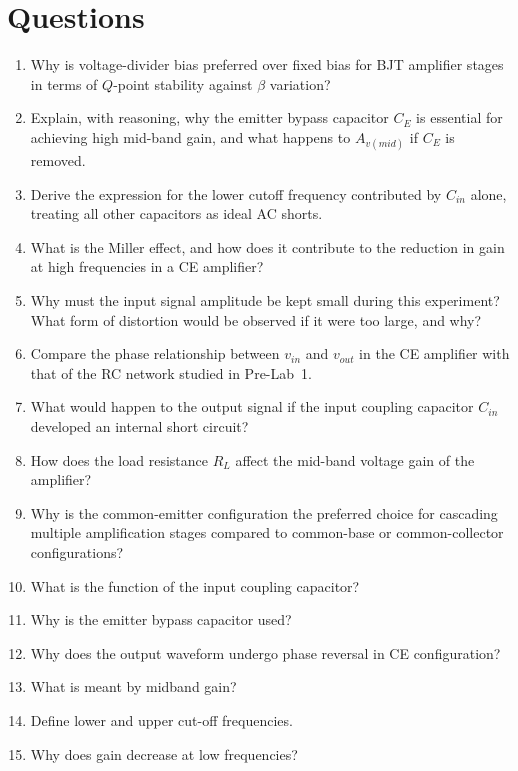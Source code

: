 \section{Questions}
\begin{enumerate}[label=Q\arabic*.]
	\item Why is voltage-divider bias preferred over fixed bias for BJT amplifier stages in terms of $Q$-point stability against $\beta$ variation?
	\item Explain, with reasoning, why the emitter bypass capacitor $C_E$ is essential for achieving high mid-band gain, and what happens to $A_{v(mid)}$ if $C_E$ is removed.
	\item Derive the expression for the lower cutoff frequency contributed by $C_{in}$ alone, treating all other capacitors as ideal AC shorts.
	\item What is the Miller effect, and how does it contribute to the reduction in gain at high frequencies in a CE amplifier?
	\item Why must the input signal amplitude be kept small during this experiment? What form of distortion would be observed if it were too large, and why?
	\item Compare the phase relationship between $v_{in}$ and $v_{out}$ in the CE amplifier with that of the RC network studied in Pre-Lab~1.
	\item What would happen to the output signal if the input coupling capacitor $C_{in}$ developed an internal short circuit?
	\item How does the load resistance $R_L$ affect the mid-band voltage gain of the amplifier?
	\item Why is the common-emitter configuration the preferred choice for cascading multiple amplification stages compared to common-base or common-collector configurations?
	\item What is the function of the input coupling capacitor?
	\item Why is the emitter bypass capacitor used?
	\item Why does the output waveform undergo phase reversal in CE configuration?
	\item What is meant by midband gain?
	\item Define lower and upper cut-off frequencies.
	\item Why does gain decrease at low frequencies?

\end{enumerate}
